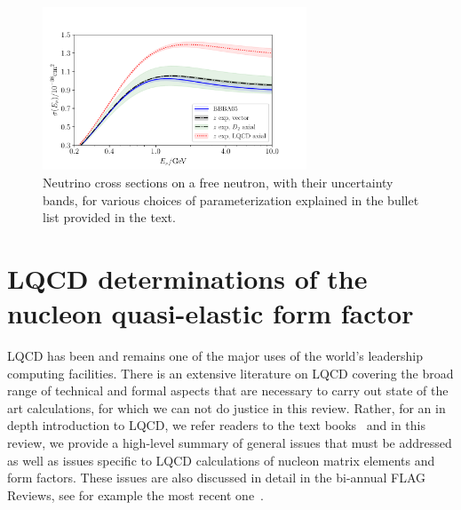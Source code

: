\documentclass{ar-1col}
\begin{document}
\begin{figure}[hbt!]
 \centering
 \includegraphics[width=0.7\textwidth]{plots/xsec_comparison-standalone.pdf}\vspace{4pt}
\caption{
 Neutrino cross sections on a free neutron, with their uncertainty bands,
 for various choices of parameterization explained in the bullet list provided in the text.
 \label{fig:nucleonxsec}
}
\end{figure}


\section{LQCD determinations of the nucleon quasi-elastic form factor\label{sec:lqcd}}

LQCD has been and remains one of the major uses of the world's leadership computing facilities.
There is an extensive literature on LQCD covering the broad range of technical and formal aspects that are necessary to carry out state of the art calculations, for which we can not do justice in this review.
Rather, for an in depth introduction to LQCD, we refer readers to the text books~\cite{Smit:2002ug,DeGrand:2006zz,Gattringer:2010zz} and in this review, we provide a high-level summary of general issues that must be addressed as well as issues specific to LQCD calculations of nucleon matrix elements and form factors.
These issues are also discussed in detail in the bi-annual FLAG Reviews, see for example the most recent one~\cite{Aoki:2021kgd}.%
\begin{marginnote}
\end{marginnote}
\end{document}
